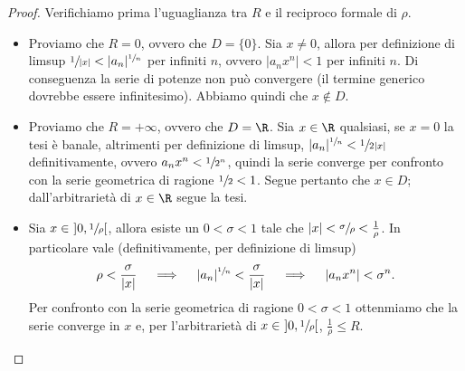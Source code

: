 \begin{proof}Verifichiamo prima l'uguaglianza tra $R$ e il reciproco formale di $\rho$.
    \begin{itemize}[leftmargin = 50pt]
        \item[\boxed{\rho = +\infty}] Proviamo che $R=0$, ovvero che $D = \{0\}$. Sia $x\neq 0$, allora per definizione di limsup $\sfrac{1}{|x|}<|a_n|^{\sfrac{1}{n}}$ per infiniti $n$, ovvero $|a_nx^n|<1$ per infiniti $n$. Di conseguenza la serie di potenze non può convergere (il termine generico dovrebbe essere infinitesimo). Abbiamo quindi che $x\notin D$.
        \item[\boxed{\rho = 0}] Proviamo che $R=+\infty$, ovvero che $D=\R$. Sia $x\in \R$ qualsiasi, se $x=0$ la tesi è banale, altrimenti per definizione di limsup, $|a_n|^{\sfrac{1}{n}}<\sfrac{1}{2|x|}$ definitivamente, ovvero $a_n x^n<\sfrac{1}{2^n}$, quindi la serie converge per confronto con la serie geometrica di ragione $\sfrac{1}{2}<1$. Segue pertanto che $x\in D$; dall'arbitrarietà di $x\in \R$ segue la tesi.
        \item[\boxed{\rho \in \R_{>0}}] Sia $x\in \ ]0,\sfrac{1}{\rho}[$, allora esiste un $0<\sigma<1$ tale che $|x|<\sfrac{\sigma}{\rho}<\frac{1}{\rho}$. In particolare vale (definitivamente, per definizione di limsup)
        \[\rho < \frac{\sigma}{|x|} \quad \implies \quad |a_n|^{\sfrac{1}{n}}<\frac{\sigma}{|x|}\quad \implies \quad|a_nx^n|<\sigma^n.\]
        Per confronto con la serie geometrica di ragione $0<\sigma<1$ ottenmiamo che la serie converge in $x$ e, per l'arbitrarietà di $x \in\ ]0,\sfrac{1}{\rho}[$, $\frac{1}{\rho}\leq R$.


\end{itemize}
\end{proof}
